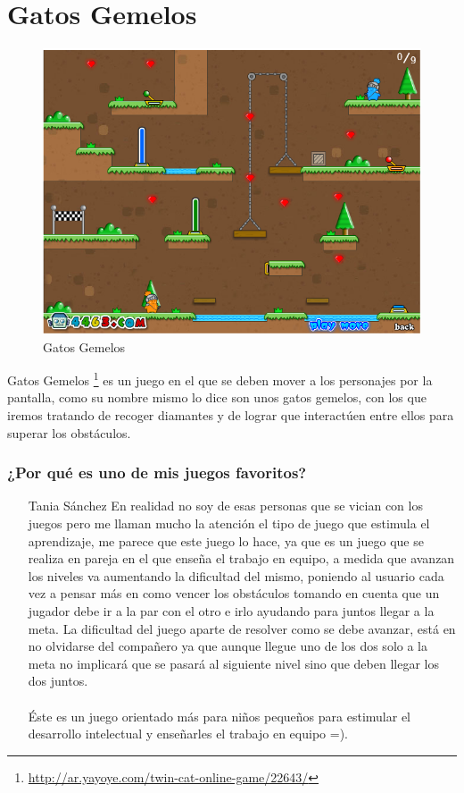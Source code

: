 \section{Gatos Gemelos}

\begin{figure}[htbp]
\begin{center}
\includegraphics[width=.60\textwidth]{./imagenes/gatos1.png}
\caption{Gatos Gemelos}
\label{Gatos Gemelos}
\end{center}
\end{figure}
Gatos Gemelos \footnote{\url{http://ar.yayoye.com/twin-cat-online-game/22643/}} es un juego en el que se deben mover a los personajes por la pantalla, como su nombre mismo lo dice son unos gatos gemelos, con los que iremos tratando de recoger diamantes y de lograr que interactúen entre ellos para superar los obstáculos.

\subsubsection{¿Por qué es uno de mis juegos favoritos?}
\begin{itemize}
\item[Tania Sánchez] En realidad no soy de esas personas que se vician con los juegos pero me llaman mucho la atención el tipo de juego que estimula el aprendizaje, me parece que este juego lo hace, ya que es un juego que se realiza en pareja en el que enseña el trabajo en equipo, a medida que avanzan los niveles va aumentando la dificultad del mismo, poniendo al usuario cada vez a pensar más en como vencer los obstáculos tomando en cuenta que un jugador debe ir a la par con el otro e irlo ayudando para juntos llegar a la meta. La dificultad del juego aparte de resolver como se debe avanzar, está en no olvidarse del compañero ya que aunque llegue uno de los dos solo a la meta no implicará que se pasará al siguiente nivel sino que deben llegar los dos juntos. 
\\
\\
Éste es un juego orientado más para niños pequeños para estimular el desarrollo intelectual y enseñarles el trabajo en equipo =).
\end{itemize}
